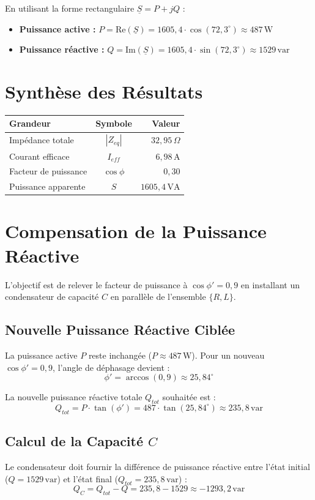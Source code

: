 \documentclass[12pt]{article}
\begin{document}
En utilisant la forme rectangulaire $\underline{S} = P + jQ$ :
\begin{itemize}
    \item \textbf{Puissance active :} $P = \text{Re}(\underline{S}) = 1605,4 \cdot \cos(72,3^\circ) \approx 487 \, \text{W}$
    \item \textbf{Puissance réactive :} $Q = \text{Im}(\underline{S}) = 1605,4 \cdot \sin(72,3^\circ) \approx 1529 \, \text{var}$
\end{itemize}

\section{Synthèse des Résultats}
\begin{table}[h]
    \centering
    \begin{tabular}{lcr}
        \toprule
        Grandeur & Symbole & Valeur \\
        \midrule
        Impédance totale & $|Z_{eq}|$ & $32,95 \, \Omega$ \\
        Courant efficace & $I_{eff}$ & $6,98 \, \text{A}$ \\
        Facteur de puissance & $\cos \phi$ & $0,30$ \\
        Puissance apparente & $S$ & $1605,4 \, \text{VA}$ \\
        \bottomrule
    \end{tabular}
\end{table}

\section{Compensation de la Puissance Réactive}
L'objectif est de relever le facteur de puissance à $\cos \phi' = 0,9$ en installant un condensateur de capacité $C$ en parallèle de l'ensemble $\{R, L\}$.

\subsection{Nouvelle Puissance Réactive Ciblée}
La puissance active $P$ reste inchangée ($P \approx 487 \, \text{W}$). Pour un nouveau $\cos \phi' = 0,9$, l'angle de déphasage devient :
\[ \phi' = \arccos(0,9) \approx 25,84^\circ \]

La nouvelle puissance réactive totale $Q_{tot}$ souhaitée est :
\[ Q_{tot} = P \cdot \tan(\phi') = 487 \cdot \tan(25,84^\circ) \approx 235,8 \, \text{var} \]

\subsection{Calcul de la Capacité $C$}
Le condensateur doit fournir la différence de puissance réactive entre l'état initial ($Q = 1529 \, \text{var}$) et l'état final ($Q_{tot} = 235,8 \, \text{var}$) :
\[ Q_C = Q_{tot} - Q = 235,8 - 1529 \approx -1293,2 \, \text{var} \]
\end{document}
